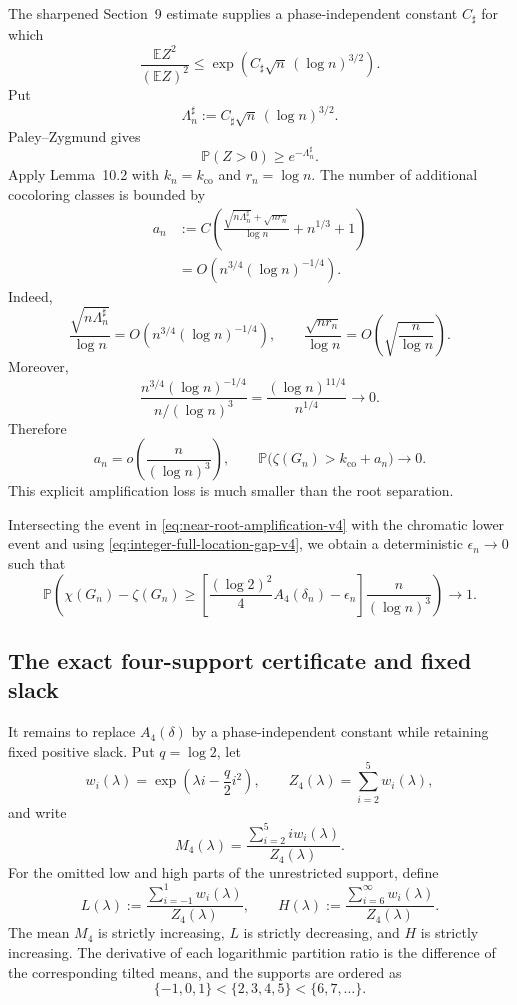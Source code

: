 The sharpened Section~9 estimate supplies a phase-independent constant
$C_\sharp$ for which
\[
  \frac{\mathbb E Z^2}{(\mathbb E Z)^2}
  \le
  \exp\!\left(C_\sharp\sqrt n\,(\log n)^{3/2}\right).
\]
Put
\[
  \Lambda_n^\sharp
  :=C_\sharp\sqrt n\,(\log n)^{3/2}.
\]
Paley--Zygmund gives
\[
  \mathbb P(Z>0)\ge e^{-\Lambda_n^\sharp}.
\]
Apply Lemma~10.2 with $k_n=k_{\mathrm{co}}$ and
$r_n=\log n$.  The number of additional cocoloring classes is bounded by
\[
\begin{aligned}
  a_n
  &:=C\left(
    \frac{\sqrt{n\Lambda_n^\sharp}+\sqrt{nr_n}}{\log n}
    +n^{1/3}+1
  \right)\\
  &=O\!\left(n^{3/4}(\log n)^{-1/4}\right).
\end{aligned}
\]
Indeed,
\[
  \frac{\sqrt{n\Lambda_n^\sharp}}{\log n}
  =O\!\left(n^{3/4}(\log n)^{-1/4}\right),
  \qquad
  \frac{\sqrt{nr_n}}{\log n}
  =O\!\left(\sqrt{\frac n{\log n}}\right).
\]
Moreover,
\[
  \frac{n^{3/4}(\log n)^{-1/4}}{n/(\log n)^3}
  =\frac{(\log n)^{11/4}}{n^{1/4}}
  \longrightarrow0.
\]
Therefore
\begin{equation}
  a_n=o\!\left(\frac{n}{(\log n)^3}\right),
  \qquad
  \mathbb P\bigl(\zeta(G_n)>k_{\mathrm{co}}+a_n\bigr)
  \longrightarrow0.
  \label{eq:near-root-amplification-v4}
\end{equation}
This explicit amplification loss is much smaller than the root separation.

Intersecting the event in \eqref{eq:near-root-amplification-v4} with the
chromatic lower event and using
\eqref{eq:integer-full-location-gap-v4}, we obtain a deterministic
$\epsilon_n\to0$ such that
\begin{equation}
  \mathbb P\!\left(
    \chi(G_n)-\zeta(G_n)
    \ge
    \left[
      \frac{(\log 2)^2}{4}A_4(\delta_n)-\epsilon_n
    \right]
    \frac{n}{(\log n)^3}
  \right)
  \longrightarrow1.
  \label{eq:phase-resolved-full-final-v4}
\end{equation}

\subsection{The exact four-support certificate and fixed slack}

It remains to replace $A_4(\delta)$ by a phase-independent constant while
retaining fixed positive slack. Put $q=\log 2$, let
\[
  w_i(\lambda)=\exp\!\left(\lambda i-\frac q2i^2\right),
  \qquad
  Z_4(\lambda)=\sum_{i=2}^{5}w_i(\lambda),
\]
and write
\[
  M_4(\lambda)
  =
  \frac{\sum_{i=2}^{5}i w_i(\lambda)}{Z_4(\lambda)}.
\]
For the omitted low and high parts of the unrestricted support, define
\[
  L(\lambda)
  :=
  \frac{\sum_{i=-1}^{1}w_i(\lambda)}{Z_4(\lambda)},
  \qquad
  H(\lambda)
  :=
  \frac{\sum_{i=6}^{\infty}w_i(\lambda)}{Z_4(\lambda)}.
\]
The mean $M_4$ is strictly increasing, $L$ is strictly decreasing, and $H$ is
strictly increasing. The derivative of each logarithmic partition ratio is the
difference of the corresponding tilted means, and the supports are ordered as
\[
  \{-1,0,1\}<\{2,3,4,5\}<\{6,7,\ldots\}.
\]

